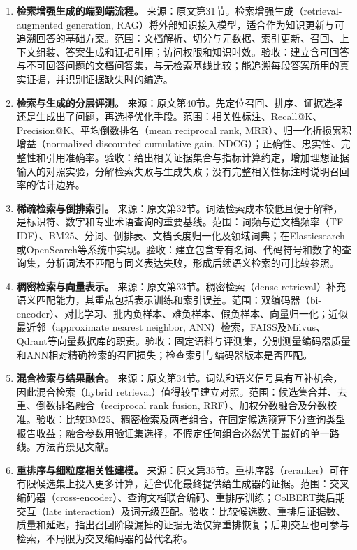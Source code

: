 \documentclass[UTF8,12pt,a4paper,fontset=fandol]{ctexart}
\begin{document}
\begin{enumerate}[resume=techrank]
\item \textbf{检索增强生成的端到端流程。}\label{tech:rag}
来源：原文第31节。检索增强生成（retrieval-augmented generation, RAG）将外部知识接入模型，适合作为知识更新与可追溯回答的基础方案。范围：文档解析、切分与元数据、索引更新、召回、上下文组装、答案生成和证据引用；访问权限和知识时效。验收：建立含可回答与不可回答问题的文档问答集，与无检索基线比较；能追溯每段答案所用的真实证据，并识别证据缺失时的编造。

\item \textbf{检索与生成的分层评测。}\label{tech:rageval}
来源：原文第40节。先定位召回、排序、证据选择还是生成出了问题，再选择优化手段。范围：相关性标注、Recall@K、Precision@K、平均倒数排名（mean reciprocal rank, MRR）、归一化折损累积增益（normalized discounted cumulative gain, NDCG）；正确性、忠实性、完整性和引用准确率。验收：给出相关证据集合与指标计算约定，增加理想证据输入的对照实验，分解检索失败与生成失败；没有完整相关性标注时说明召回率的估计边界。

\item \textbf{稀疏检索与倒排索引。}\label{tech:sparse}
来源：原文第32节。词法检索成本较低且便于解释，是标识符、数字和专业术语查询的重要基线。范围：词频与逆文档频率（TF-IDF）、BM25、分词、倒排表、文档长度归一化及领域词典；在Elasticsearch或OpenSearch等系统中实现。验收：建立包含专有名词、代码符号和数字的查询集，分析词法不匹配与同义表达失败，形成后续语义检索的可比较参照。

\item \textbf{稠密检索与向量表示。}\label{tech:dense}
来源：原文第33节。稠密检索（dense retrieval）补充语义匹配能力，其重点包括表示训练和索引误差。范围：双编码器（bi-encoder）、对比学习、批内负样本、难负样本、假负样本、向量归一化；近似最近邻（approximate nearest neighbor, ANN）检索，FAISS及Milvus、Qdrant等向量数据库的职责。验收：固定语料与评测集，分别测量编码器质量和ANN相对精确检索的召回损失；检查索引与编码器版本是否匹配。

\item \textbf{混合检索与结果融合。}\label{tech:hybrid}
来源：原文第34节。词法和语义信号具有互补机会，因此混合检索（hybrid retrieval）值得较早建立对照。范围：候选集合并、去重、倒数排名融合（reciprocal rank fusion, RRF）、加权分数融合及分数校准。验收：比较BM25、稠密检索及两者组合，在固定候选预算下分查询类型报告收益；融合参数用验证集选择，不假定任何组合必然优于最好的单一路线。方法背景见文献\cite{contextual}。

\item \textbf{重排序与细粒度相关性建模。}\label{tech:reranker}
来源：原文第35节。重排序器（reranker）可在有限候选集上投入更多计算，适合优化最终提供给生成器的证据。范围：交叉编码器（cross-encoder）、查询文档联合编码、重排序训练；ColBERT类后期交互（late interaction）及词元级匹配。验收：比较候选数、重排后证据数、质量和延迟，指出召回阶段漏掉的证据无法仅靠重排恢复；后期交互也可参与检索，不局限为交叉编码器的替代名称。


\end{enumerate}
\end{document}

